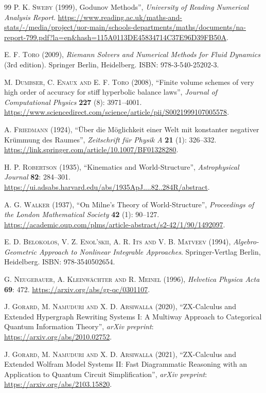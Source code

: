 \documentclass{article}
\begin{document}
\begin{thebibliography}{99}
\textsc{P. K. Sweby} (1999), Godunov Methods'', \textit{University of Reading Numerical Analysis Report}. \url{https://www.reading.ac.uk/maths-and-stats/-/media/project/uor-main/schools-departments/maths/documents/na-report-799.pdf?la=en&hash=115A0113DE45834714C37E96D39FB50A}.

\textsc{E. F. Toro} (2009), \textit{Riemann Solvers and Numerical Methods for Fluid Dynamics} (3rd edition). Springer Berlin, Heidelberg. ISBN: 978-3-540-25202-3.

\textsc{M. Dumbser, C. Enaux and E. F. Toro} (2008), ``Finite volume schemes of very high order of accuracy for stiff hyperbolic balance laws'', \textit{Journal of Computational Physics} \textbf{227} (8): 3971--4001. \url{https://www.sciencedirect.com/science/article/pii/S0021999107005578}.

\textsc{A. Friedmann} (1924), ``\"Uber die M\"oglichkeit einer Welt mit konstanter negativer Kr\"ummung des Raumes'', \textit{Zeitschrift f\"ur Physik A} \textbf{21} (1): 326--332. \url{https://link.springer.com/article/10.1007/BF01328280}.

\textsc{H. P. Robertson} (1935), ``Kinematics and World-Structure'', \textit{Astrophysical Journal} \textbf{82}: 284--301. \url{https://ui.adsabs.harvard.edu/abs/1935ApJ....82..284R/abstract}.

\textsc{A. G. Walker} (1937), ``On Milne's Theory of World-Structure'', \textit{Proceedings of the London Mathematical Society} \textbf{42} (1): 90--127. \url{https://academic.oup.com/plms/article-abstract/s2-42/1/90/1492097}.

\textsc{E. D. Belokolos, V. Z. Enol'skii, A. R. Its and V. B. Matveev} (1994), \textit{Algebro-Geometric Approach to Nonlinear Integrable Approaches}. Springer-Vertlag Berlin, Heidelberg. ISBN: 978-3540502654.

\textsc{G. Neugebauer, A. Kleinw\"achter and R. Meinel} (1996), \textit{Helvetica Physica Acta} \textbf{69}: 472. \url{https://arxiv.org/abs/gr-qc/0301107}.

\textsc{J. Gorard, M. Namuduri and X. D. Arsiwalla} (2020), ``ZX-Calculus and Extended Hypergraph Rewriting Systems I: A Multiway Approach to Categorical Quantum Information Theory'', \textit{arXiv preprint}: \url{https://arxiv.org/abs/2010.02752}.

\textsc{J. Gorard, M. Namuduri and X. D. Arsiwalla} (2021), ``ZX-Calculus and Extended Wolfram Model Systems II: Fast Diagrammatic Reasoning with an Application to Quantum Circuit Simplification'', \textit{arXiv preprint}: \url{https://arxiv.org/abs/2103.15820}.


\end{thebibliography}
\end{document}
